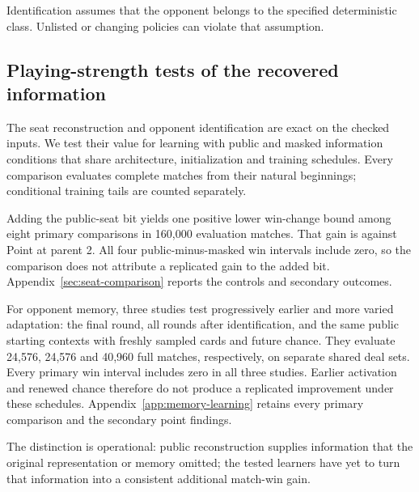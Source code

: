 \begin{table}[ht]
\centering\small

\caption{Identification from public training histories within the fixed
WP/Point candidate class. Every identified case is correct. The last column
conditions on reaching the final round; all earlier terminations remain in
the preceding columns.}
\label{tab:public-revelation}
\end{table}

Identification assumes that the opponent belongs to the specified deterministic
class. Unlisted or changing policies can violate that assumption.

\subsection{Playing-strength tests of the recovered information}
The seat reconstruction and opponent identification are exact on the checked
inputs. We test their value for learning with public and masked information
conditions that share architecture, initialization and training schedules.
Every comparison evaluates complete matches from their natural beginnings;
conditional training tails are counted separately.

Adding the public-seat bit yields one positive lower win-change bound among
eight primary comparisons in 160,000 evaluation matches. That gain is against
Point at parent 2. All four public-minus-masked win intervals include zero,
so the comparison does not attribute a replicated gain to the added bit.
Appendix~\ref{sec:seat-comparison} reports the controls and secondary outcomes.

For opponent memory, three studies test progressively earlier and more varied
adaptation: the final round, all rounds after identification, and the same
public starting contexts with freshly sampled cards and future chance.
They evaluate 24,576, 24,576 and 40,960 full matches, respectively, on separate
shared deal sets. Every primary win interval includes zero in all three
studies. Earlier activation and renewed chance therefore do not produce a
replicated improvement under these schedules. Appendix~\ref{app:memory-learning}
retains every primary comparison and the secondary point findings.

The distinction is operational: public reconstruction supplies information
that the original representation or memory omitted; the tested learners have
yet to turn that information into a consistent additional match-win gain.

